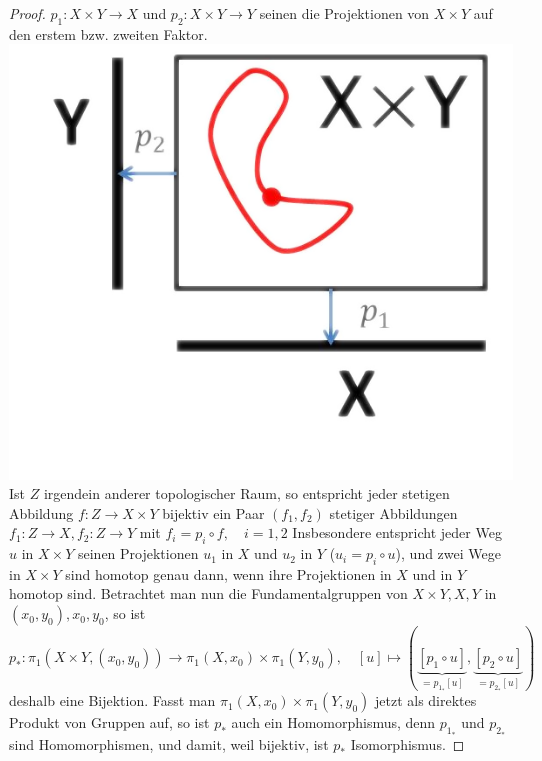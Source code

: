 \documentclass[a4paper,11pt,notitlepage]{report}
\theoremstyle{definition}
\begin{document}
\begin{proof}
	$p_1 \colon X \times Y \rightarrow X$ und $p_2 \colon X \times Y \rightarrow Y$ seinen die Projektionen von $X \times Y$ auf den erstem bzw. zweiten Faktor. \newline
	\includegraphics[scale=0.4]{images/Produkt_Fundamentalgruppe.png} \newline
Ist $Z$ irgendein anderer topologischer Raum, so entspricht jeder stetigen Abbildung $f \colon Z \rightarrow X \times Y$ bijektiv ein Paar $(f_1, f_2)$ stetiger Abbildungen $f_1 \colon Z \rightarrow X, f_2 \colon Z \rightarrow Y$ mit $f_i = p_i \circ f, \quad i=1,2$
	\newline
	Insbesondere entspricht jeder Weg $u$ in $X \times Y$ seinen Projektionen $u_1$ in $X$ und $u_2$ in $Y$ ($u_i = p_i \circ u$),  und zwei Wege in $X \times Y$ sind homotop genau dann, wenn ihre Projektionen in $X$ und in $Y$ homotop sind.
	\newline
	Betrachtet man nun die Fundamentalgruppen von $X \times Y, X, Y$ in $(x_0,y_0), x_0, y_0$, so ist $$p_* \colon \pi_1(X \times Y, (x_0, y_0)) \rightarrow \pi_1(X, x_0) \times \pi_1(Y,y_0), \quad [u] \mapsto (\underbrace{[p_1 \circ u]}_{= p_{1_*}[u]}, \underbrace{[p_2 \circ u]}_{=p_{2_*}[u]})$$
	deshalb eine Bijektion.
	\newline
	Fasst man $\pi_1(X,x_0) \times \pi_1(Y,y_0)$ jetzt als direktes Produkt von Gruppen auf, so ist $p_*$ auch ein Homomorphismus, denn $p_{1_*}$ und $p_{2_*}$ sind Homomorphismen, und damit, weil bijektiv, ist $p_*$ Isomorphismus.
\end{proof}
\end{document}

